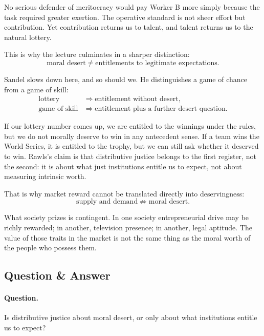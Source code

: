 No serious defender of meritocracy would pay Worker B more simply because the task required greater exertion. The operative standard is not sheer effort but contribution. Yet contribution returns us to talent, and talent returns us to the natural lottery.

This is why the lecture culminates in a sharper distinction:
\begin{equation}
\text{moral desert}\neq\text{entitlements to legitimate expectations}.
\end{equation}

Sandel slows down here, and so should we. He distinguishes a game of chance from a game of skill:
\begin{align}
\text{lottery} &\Longrightarrow \text{entitlement without desert},\\
\text{game of skill} &\Longrightarrow \text{entitlement plus a further desert question}.
\end{align}

If our lottery number comes up, we are entitled to the winnings under the rules, but we do not morally deserve to win in any antecedent sense. If a team wins the World Series, it is entitled to the trophy, but we can still ask whether it deserved to win. Rawls's claim is that distributive justice belongs to the first register, not the second: it is about what just institutions entitle us to expect, not about measuring intrinsic worth.

That is why market reward cannot be translated directly into deservingness:
\begin{equation}
\text{supply and demand}\not\Longrightarrow \text{moral desert}.
\end{equation}

What society prizes is contingent. In one society entrepreneurial drive may be richly rewarded; in another, television presence; in another, legal aptitude. The value of those traits in the market is not the same thing as the moral worth of the people who possess them.

\subsection{Question \& Answer}

\paragraph{Question.} Is distributive justice about moral desert, or only about what institutions entitle us to expect?


